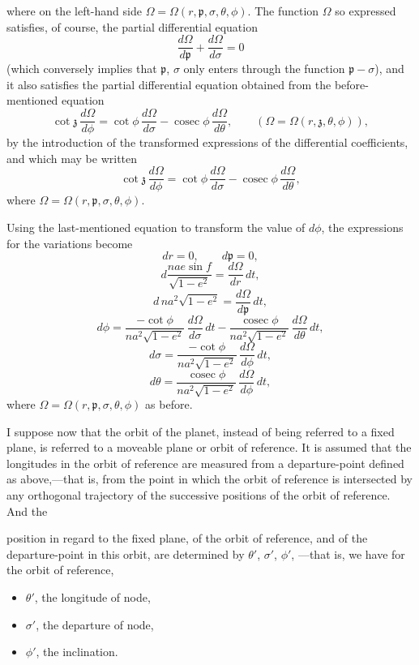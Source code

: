 \documentclass[11pt]{article}
\begin{document}
\bigskip
{} where on the left-hand side $\Omega = \Omega(r,\mathfrak{p},\sigma,\theta,\phi)$. The function $\Omega$ so expressed satisfies, of course, the partial differential equation
\[
\frac{d\Omega}{d\mathfrak{p}} + \frac{d\Omega}{d\sigma} = 0
\]
(which conversely implies that $\mathfrak{p}$, $\sigma$ only enters through the function $\mathfrak{p}-\sigma$), and it also satisfies the partial differential equation obtained from the before-mentioned equation
\[
\cot\mathfrak{z}\,\frac{d\Omega}{d\phi} = \cot\phi\,\frac{d\Omega}{d\sigma} - \operatorname{cosec}\phi\,\frac{d\Omega}{d\theta}, \qquad (\Omega=\Omega(r,\mathfrak{z},\theta,\phi)),
\]
by the introduction of the transformed expressions of the differential coefficients, and which may be written
\[
\cot\mathfrak{z}\,\frac{d\Omega}{d\phi} = \cot\phi\,\frac{d\Omega}{d\sigma} - \operatorname{cosec}\phi\,\frac{d\Omega}{d\theta},
\]
where $\Omega = \Omega(r,\mathfrak{p},\sigma,\theta,\phi)$.

\medskip
\noindent Using the last-mentioned equation to transform the value of $d\phi$, the expressions for the variations become
\[
dr=0,\qquad d\mathfrak{p}=0,
\]
\[
d\frac{nae\sin f}{\sqrt{1-e^{2}}} = \frac{d\Omega}{dr}\,dt,
\]
\[
d\,na^{2}\sqrt{1-e^{2}} = \frac{d\Omega}{d\mathfrak{p}}\,dt,
\]
\[
d\phi = \frac{-\cot\phi}{na^{2}\sqrt{1-e^{2}}}\,\frac{d\Omega}{d\sigma}\,dt - \frac{\operatorname{cosec}\phi}{na^{2}\sqrt{1-e^{2}}}\,\frac{d\Omega}{d\theta}\,dt,
\]
\[
d\sigma = \frac{-\cot\phi}{na^{2}\sqrt{1-e^{2}}}\,\frac{d\Omega}{d\phi}\,dt,
\]
\[
d\theta = \frac{\operatorname{cosec}\phi}{na^{2}\sqrt{1-e^{2}}}\,\frac{d\Omega}{d\phi}\,dt,
\]
where $\Omega = \Omega(r,\mathfrak{p},\sigma,\theta,\phi)$ as before.

\medskip
\noindent I suppose now that the orbit of the planet, instead of being referred to a fixed plane, is referred to a moveable plane or orbit of reference. It is assumed that the longitudes in the orbit of reference are measured from a departure-point defined as above,---that is, from the point in which the orbit of reference is intersected by any orthogonal trajectory of the successive positions of the orbit of reference. And the

\bigskip
{} position in regard to the fixed plane, of the orbit of reference, and of the departure-point in this orbit, are determined by $\theta'$, $\sigma'$, $\phi'$, ---that is, we have for the orbit of reference,
\begin{itemize}
\item[] $\theta'$, the longitude of node,
\item[] $\sigma'$, the departure of node,
\item[] $\phi'$, the inclination.
\end{itemize}
\end{document}
